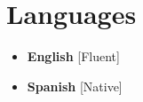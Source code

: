 \documentclass[11pt,a4paper,sans]{moderncv}
\begin{document}
\section{Languages}
\begin{multicols}{2}
    \begin{itemize}[leftmargin=0.6cm, label=\textbullet]
    \setlength\itemsep{0.3cm}
    \item \textbf{English} [Fluent]
    \item {\textbf{Spanish} [Native]}
    \end{itemize}
\end{multicols}
\end{document}
